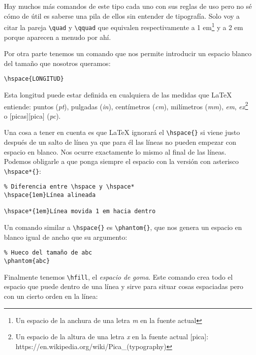 Hay muchos más comandos de este tipo cada uno con sus reglas de uso pero
no sé cómo de útil es saberse una pila de ellos sin entender de
tipografía. Solo voy a citar la pareja \lstinline!\quad! y
\lstinline!\qquad! que equivalen respectivamente a 1 em\footnote{Un
  espacio de la anchura de una letra \emph{m} en la fuente actual} y a 2
em porque aparecen a menudo por ahí.

Por otra parte tenemos un comando que nos permite introducir un espacio
blanco del tamaño que nosotros queramos:

\begin{lstlisting}
\hspace{LONGITUD}
\end{lstlisting}

Esta longitud puede estar definida en cualquiera de las medidas que
LaTeX entiende: puntos (\emph{pt}), pulgadas (\emph{in}), centímetros
(\emph{cm}), milímetros (\emph{mm}), \emph{em}, \emph{ex}\footnote{Un
  espacio de la altura de una letra \emph{x} en la fuente actual
  {[}pica{]}: https://en.wikipedia.org/wiki/Pica\_(typography)} o
{[}picas{]}{[}pica{]} (\emph{pc}).

Una cosa a tener en cuenta es que LaTeX ignorará el
\lstinline!\hspace{}! si viene justo después de un salto de línea ya que
para él las líneas no pueden empezar con espacio en blanco. Nos ocurre
exactamente lo mismo al final de las líneas. Podemos obligarle a que
ponga siempre el espacio con la versión con asterisco
\lstinline!\hspace*{}!:

\begin{lstlisting}
% Diferencia entre \hspace y \hspace*
\hspace{1em}Línea alineada

\hspace*{1em}Línea movida 1 em hacia dentro 
\end{lstlisting}

Un comando similar a \lstinline!\hspace{}! es \lstinline!\phantom{}!,
que nos genera un espacio en blanco igual de ancho que su argumento:

\begin{lstlisting}
% Hueco del tamaño de abc
\phantom{abc}
\end{lstlisting}

Finalmente tenemos \lstinline!\hfill!, el \emph{espacio de goma}. Este
comando crea todo el espacio que puede dentro de una línea y sirve para
situar cosas espaciadas pero con un cierto orden en la línea:

